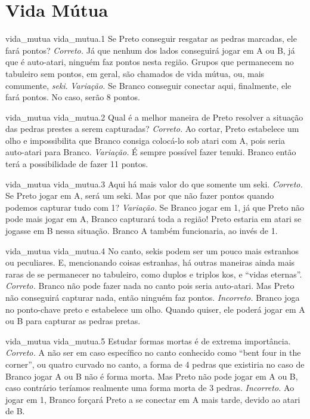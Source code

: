 \chapter{Vida Mútua}

\emptypage

\problemAnswerDiagram
  {vida_mutua}
  {vida_mutua.1}
  {Se Preto conseguir resgatar as pedras marcadas, ele fará pontos?}
  {\emph{Correto.} Já que nenhum dos lados conseguirá jogar em A ou B, já que é auto-atari, ninguém faz pontos nesta região. Grupos que permanecem no tabuleiro sem pontos, em geral, são chamados de vida mútua, ou, mais comumente, \emph{seki}.}
  {\emph{Variação.} Se Branco conseguir conectar aqui, finalmente, ele fará pontos. No caso, serão 8 pontos.}

\problemAnswerDiagram
  {vida_mutua}
  {vida_mutua.2}
  {Qual é a melhor maneira de Preto resolver a situação das pedras prestes a serem capturadas?}
  {\emph{Correto.} Ao cortar, Preto estabelece um olho e impossibilita que Branco consiga colocá-lo sob atari com A, pois seria auto-atari para Branco.}
  {\emph{Variação.} É sempre possível fazer tenuki. Branco então terá a possibilidade de fazer 11 pontos.}

\problemAnswerDiagram
  {vida_mutua}
  {vida_mutua.3}
  {Aqui há mais valor do que somente um seki.}
  {\emph{Correto.} Se Preto jogar em A, será um seki. Mas por que não fazer pontos quando podemos capturar tudo com 1?}
  {\emph{Variação.} Se Branco jogar em 1, já que Preto não pode mais jogar em A, Branco capturará toda a região! Preto estaria em atari se jogasse em B nessa situação. Branco A também funcionaria, ao invés de 1.}

\problemAnswerDiagram
  {vida_mutua}
  {vida_mutua.4}
  {No canto, sekis podem ser um pouco mais estranhos ou peculiares. E, mencionando coisas estranhas, há outras maneiras ainda mais raras de se permanecer no tabuleiro, como duplos e triplos kos, e ``vidas eternas''.}
  {\emph{Correto.} Branco não pode fazer nada no canto pois seria auto-atari. Mas Preto não conseguirá capturar nada, então ninguém faz pontos.}
  {\emph{Incorreto.} Branco joga no ponto-chave preto e estabelece um olho. Quando quiser, ele poderá jogar em A ou B para capturar as pedras pretas.}


\problemAnswerDiagram
  {vida_mutua}
  {vida_mutua.5}
  {Estudar formas mortas é de extrema importância.}
  {\emph{Correto.} A não ser em caso específico no canto conhecido como ``bent four in the corner'', ou quatro curvado no canto, a forma de 4 pedras que existiria no caso de Branco jogar A ou B não é forma morta. Mas Preto não pode jogar em A ou B, caso contrário teríamos realmente uma forma morta de 3 pedras.}
  {\emph{Incorreto.} Ao jogar em 1, Branco forçará Preto a se conectar em A mais tarde, devido ao atari de B.}